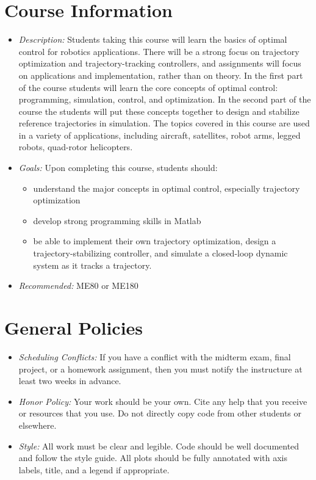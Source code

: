 \documentclass[onecolumn]{article}
\begin{document}
\section*{Course Information}
\vspace{-0.6em} \begin{itemize}  \setlength\itemsep{0em}
  \item \textit{Description: }
    Students taking this course will learn the basics of optimal control for robotics applications.
    There will be a strong focus on trajectory optimization and trajectory-tracking controllers,
      and assignments will focus on applications and implementation, rather than on theory.
    In the first part of the course students will learn the core concepts of optimal control:
      programming, simulation, control, and optimization.
    In the second part of the course the students will put these concepts together to
      design and stabilize reference trajectories in simulation.
    The topics covered in this course are used in a variety of applications,
      including aircraft, satellites, robot arms, legged robots, quad-rotor helicopters.

  \item \textit{Goals: } Upon completing this course, students should:
  \vspace{-0.6em} \begin{itemize}  \setlength\itemsep{0em}
    \item understand the major concepts in optimal control, especially trajectory optimization
    \item develop strong programming skills in Matlab
    \item be able to
      implement their own trajectory optimization,
      design a trajectory-stabilizing controller,
      and simulate a closed-loop dynamic system as it tracks a trajectory.
  \end{itemize}
  \item \textit{Recommended: } ME80 or ME180
\end{itemize}

\section*{General Policies}

\vspace{-0.6em} \begin{itemize}  \setlength\itemsep{0em}
  \item \textit{Scheduling Conflicts: } If you have a conflict with the
    midterm exam, final project, or a homework assignment, then you must
    notify the instructure at least two weeks in advance.
  \item \textit{Honor Policy: }
    Your work should be your own.
    Cite any help that you receive or resources that you use.
    Do not directly copy code from other students or elsewhere.
  \item \textit{Style: } All work must be clear and legible.
   Code should be well documented and follow the style guide.
   All plots should be fully annotated with axis labels, title, and a legend if appropriate.
\end{itemize}
\end{document}
